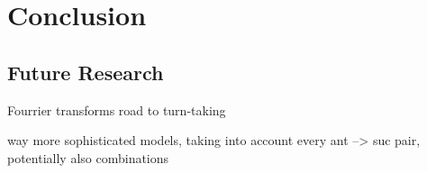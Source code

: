 
\chapter{Conclusion}
\label{ch:conclusion}
\section{Future Research}
\label{sec:conclusionfuture}
Fourrier transforms
road to turn-taking

way more sophisticated models, taking into account every ant --> suc pair, potentially also combinations